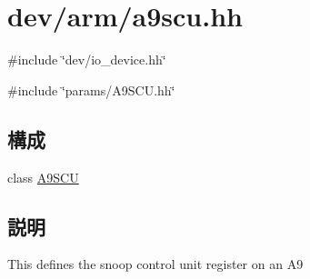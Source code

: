 \hypertarget{a9scu_8hh}{
\section{dev/arm/a9scu.hh}
\label{a9scu_8hh}
}
{\ttfamily \#include \char`\"{}dev/io\_\-device.hh\char`\"{}}\par
{\ttfamily \#include \char`\"{}params/A9SCU.hh\char`\"{}}\par
\subsection*{構成}
\begin{DoxyCompactItemize}
\item 
class \hyperlink{classA9SCU}{A9SCU}
\end{DoxyCompactItemize}


\subsection{説明}
This defines the snoop control unit register on an A9 